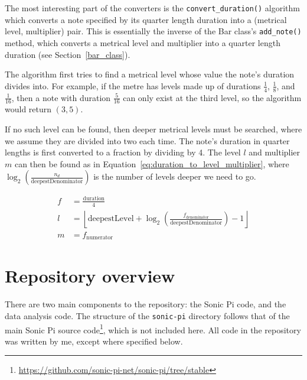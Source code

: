 \documentclass[12pt,twoside,openright]{report}
\begin{document}
The most interesting part of the converters is the \verb'convert_duration()' algorithm
which converts a note specified by its quarter length duration into a (metrical
level, multiplier) pair. This is essentially the inverse of the Bar class's
\verb'add_note()' method, which converts a metrical level and multiplier into a quarter length duration (see Section~\ref{bar_class}).

The algorithm first tries to find a metrical
level whose value the note's duration divides into. For example, if the metre
has levels made up of durations $\frac{1}{4}$, $\frac{1}{8}$, and $\frac{1}{16}$, then a note with duration $\frac{5}{16}$
can only exist at the third level, so the algorithm would return $(3,5)$.

If no
such level can be found, then deeper metrical levels must be searched, where we
assume they are divided into two each time. The note's duration in quarter
lengths is first converted to a fraction by dividing by 4. The level $l$ and
multiplier $m$ can then be found as in Equation~\ref{eq:duration_to_level_multiplier}, where $\log_2\left(\frac{n_d}{\mathrm{deepestDenominator}}\right)$ is the number of levels deeper we need to go.

\begin{equation}
    \begin{split}
        f &= \frac{\mathrm{duration}}{4} \\
        l &= \left\lfloor \mathrm{deepestLevel} + \log_2\left(\frac{f_\mathrm{denominator}}{\mathrm{deepestDenominator}}\right) - 1 \right\rfloor  \\
        m &= f_\mathrm{numerator}
    \end{split}
    \label{eq:duration_to_level_multiplier}
\end{equation}
\newpage



\section{Repository overview} \label{repository}

There are two main components to the repository: the Sonic Pi code, and the data analysis code. The structure of the \verb'sonic-pi' directory follows that of the main Sonic Pi source code\footnote{\url{https://github.com/sonic-pi-net/sonic-pi/tree/stable}}, which is not included here. All code in the repository was written by me, except where specified below.
\end{document}
